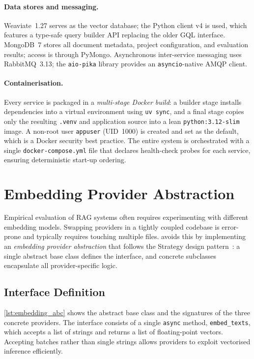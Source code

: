 \paragraph{Data stores and messaging.}
Weaviate~1.27 serves as the vector database; the Python client v4 is used,
which features a type-safe query builder API replacing the older GQL
interface.  MongoDB~7 stores all document metadata, project configuration, and
evaluation results; access is through PyMongo.  Asynchronous inter-service
messaging uses RabbitMQ~3.13; the \texttt{aio-pika} library provides an
\texttt{asyncio}-native AMQP client.

\paragraph{Containerisation.}
Every service is packaged in a \emph{multi-stage Docker build}: a builder
stage installs dependencies into a virtual environment using \texttt{uv sync},
and a final stage copies only the resulting \texttt{.venv} and application
source into a lean \texttt{python:3.12-slim} image.  A non-root user
\texttt{appuser} (UID~1000) is created and set as the default, which is a
Docker security best practice.  The entire system is orchestrated with a single
\texttt{docker-compose.yml} file that declares health-check probes for each
service, ensuring deterministic start-up ordering.

\section{Embedding Provider Abstraction}
\label{sec:embedding_abstraction}

Empirical evaluation of RAG systems often requires experimenting with different
embedding models.  Swapping providers in a tightly coupled codebase is
error-prone and typically requires touching multiple files.  \medrag{} avoids
this by implementing an \emph{embedding provider abstraction} that follows the
Strategy design pattern~\cite{gamma1994design}: a single abstract base class defines the
interface, and concrete subclasses encapsulate all provider-specific logic.

\subsection{Interface Definition}

\cref{lst:embedding_abc} shows the abstract base class and the
signatures of the three concrete providers.  The interface consists of a single
\texttt{async} method, \texttt{embed\_texts}, which accepts a list of strings
and returns a list of floating-point vectors.  Accepting batches rather than
single strings allows providers to exploit vectorised inference efficiently.

